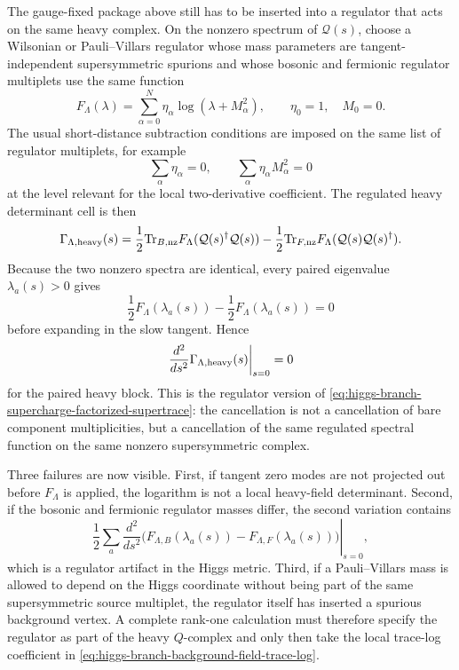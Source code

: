 \begin{example}
\label{ex:higgs-branch-regulator-compatible-heavy-complex}
The gauge-fixed package above still has to be inserted into a regulator that
acts on the same heavy complex.  On the nonzero spectrum of
\({\mathcal Q}(s)\), choose a Wilsonian or Pauli--Villars regulator whose
mass parameters are tangent-independent supersymmetric spurions and whose
bosonic and fermionic regulator multiplets use the same function
\[
  F_\Lambda(\lambda)
  =
  \sum_{\alpha=0}^N \eta_\alpha
  \log(\lambda+M_\alpha^2),
  \qquad
  \eta_0=1,\quad M_0=0 .
\]
The usual short-distance subtraction conditions are imposed on the same list
of regulator multiplets, for example
\[
  \sum_\alpha\eta_\alpha=0,\qquad
  \sum_\alpha\eta_\alpha M_\alpha^2=0
\]
at the level relevant for the local two-derivative coefficient.  The regulated
heavy determinant cell is then
\begin{equation}
  \Gamma_{\Lambda,{\rm heavy}}(s)
  =
  \frac12{\rm Tr}_{B,{\rm nz}}
    F_\Lambda({\mathcal Q}(s)^\dagger{\mathcal Q}(s))
  -
  \frac12{\rm Tr}_{F,{\rm nz}}
    F_\Lambda({\mathcal Q}(s){\mathcal Q}(s)^\dagger).
  \label{eq:higgs-branch-regulated-heavy-supertrace}
\end{equation}
Because the two nonzero spectra are identical, every paired eigenvalue
\(\lambda_a(s)>0\) gives
\[
  \frac12F_\Lambda(\lambda_a(s))
  -
  \frac12F_\Lambda(\lambda_a(s))=0
\]
before expanding in the slow tangent.  Hence
\begin{equation}
  \left.\frac{d^2}{ds^2}
  \Gamma_{\Lambda,{\rm heavy}}(s)\right|_{s=0}
  =
  0
  \label{eq:higgs-branch-regulated-heavy-supertrace-variation}
\end{equation}
for the paired heavy block.  This is the regulator version of
\eqref{eq:higgs-branch-supercharge-factorized-supertrace}: the cancellation is
not a cancellation of bare component multiplicities, but a cancellation of the
same regulated spectral function on the same nonzero supersymmetric complex.

Three failures are now visible.  First, if tangent zero modes are not projected
out before \(F_\Lambda\) is applied, the logarithm is not a local heavy-field
determinant.  Second, if the bosonic and fermionic regulator masses differ,
the second variation contains
\[
  \frac12\sum_a
  \left.\frac{d^2}{ds^2}
  \bigl(F_{\Lambda,B}(\lambda_a(s))
        -F_{\Lambda,F}(\lambda_a(s))\bigr)\right|_{s=0},
\]
which is a regulator artifact in the Higgs metric.  Third, if a
Pauli--Villars mass is allowed to depend on the Higgs coordinate without being
part of the same supersymmetric source multiplet, the regulator itself has
inserted a spurious background vertex.  A complete rank-one calculation must
therefore specify the regulator as part of the heavy \(Q\)-complex and only
then take the local trace-log coefficient in
\eqref{eq:higgs-branch-background-field-trace-log}.
\end{example}

